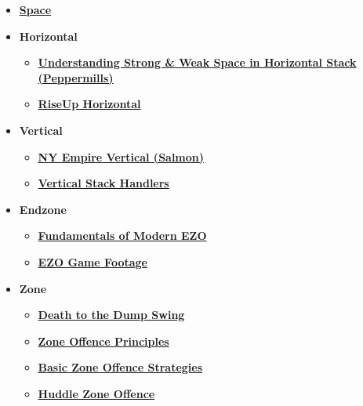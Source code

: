 \begin{itemize}
    \item \textcolor{blue}{\textbf{\href{https://skydmagazine.com/2014/07/space/}{Space}}}
    \item \textbf{Horizontal}
    \begin{itemize}
        \item \textcolor{blue}{\textbf{\href{https://ultiworld.com/2019/10/02/understanding-strong-weak-space-horizontal-stack/}{Understanding Strong \& Weak Space in Horizontal Stack (Peppermills)}}}
        \item \textcolor{blue}{\textbf{\href{https://www.youtube.com/watch?v=eSF2dov-K5A}{RiseUp Horizontal}}}
    \end{itemize}
    \item \textbf{Vertical}
    \begin{itemize}
        \item \textcolor{blue}{\textbf{\href{https://www.youtube.com/watch?v=QmZWv0bM9yM}{NY Empire Vertical (Salmon)}}}
        \item \textcolor{blue}{\textbf{\href{https://www.youtube.com/watch?v=2Tc_MOefTlo}{Vertical Stack Handlers}}}
    \end{itemize}
    \item \textbf{Endzone}
    \begin{itemize}
        \item \textcolor{blue}{\textbf{\href{https://ultiworld.com/2017/01/10/tuesday-tips-fundamentals-modern-endzone-offense-presented-spin-ultimate/}{Fundamentals of Modern EZO}}}
        \item \textcolor{blue}{\textbf{\href{https://www.youtube.com/watch?v=CwXH-e84g4I}{EZO Game Footage}}}
    \end{itemize}
    \item \textbf{Zone}
    \begin{itemize}
        \item \textcolor{blue}{\textbf{\href{https://drive.google.com/file/d/1mXuOf5zvgeKHJyjvD9ym5Ys4CCK2cqgAH33nEVVQ1uSTyEOiEFMgF17QrsU0/view?usp=sharing}{Death to the Dump Swing}}}
        \item \textcolor{blue}{\textbf{\href{https://ultiworld.com/2021/04/20/tuesday-tips-principles-of-zone-offense/}{Zone Offence Principles}}}
        \item \textcolor{blue}{\textbf{\href{https://ultiworld.com/2016/02/09/basic-zone-offensive-strategies/}{Basic Zone Offence Strategies}}}
        \item \textcolor{blue}{\textbf{\href{https://web.archive.org/web/20170719132149/https://usaultimate.org/news/the-huddle-issue-18-zone-offense/}{Huddle Zone Offence}}}
    \end{itemize}
\end{itemize}


